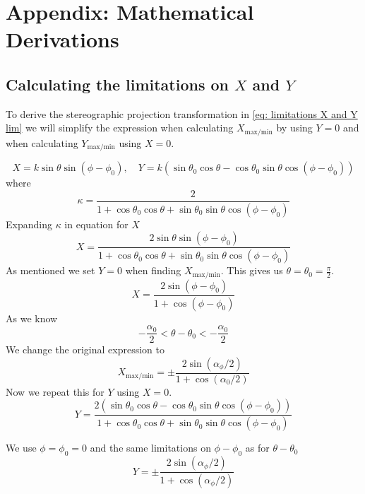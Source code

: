 \documentclass[reprint,english,notitlepage]{revtex4-2}
\begin{document}
\section{Appendix: Mathematical Derivations}
\subsection{Calculating the limitations on $ X $ and $ Y $} \label{ssec: lim x,y}
To derive the stereographic projection transformation in \ref{eq: limitations X and Y lim}
we will simplify the expression when calculating $ X_{\text{max/min}} $ by using $ Y = 0 $ and when calculating $ Y_{\text{max/min}} $ using $ X = 0 $. 

\[
X = k \sin θ \sin (ϕ - ϕ_{0}), \quad Y = k(\sin θ_{0} \cos θ - \cos  θ_{0} \sin  θ \cos (ϕ - ϕ_{0}))
\]
where
\[
κ = \frac{2}{1 + \cos  θ_{0} \cos  θ + \sin  θ_{0} \sin  θ \cos (ϕ - ϕ_{0})}
\]
Expanding $ κ $ in equation for $ X $
\[
X = \frac{2 \sin  θ \sin (ϕ - ϕ_{0})}{1 + \cos θ_{0} \cos θ + \sin  θ_{0} \sin  θ \cos (ϕ - ϕ_{0})}
\]
As mentioned we set $ Y = 0 $ when finding $ X_{\text{max/min}} $. This gives us $ θ = θ_{0} = \frac{π}{2} $. 
\[
X = \frac{2 \sin (ϕ - ϕ_{0})}{1 + \cos (ϕ-ϕ_{0})} 
\]
As we know 
\[
- \frac{α_{0}}{2} < θ - θ_{0} < - \frac{α_{0}}{2}
\]
We change the original expression to 
\[
X_{\text{max/min}} = ± \frac{2 \sin (α_{ϕ} / 2)}{1 + \cos (α_{0} / 2)}
\]
Now we repeat this for $ Y $ using $ X = 0 $. 
\[
Y = \frac{2(\sin θ_{0} \cos θ - \cos  θ_{0} \sin θ \cos (ϕ- ϕ_{0}))}{1 + \cos  θ_{0} \cos  θ + \sin  θ _{0} \sin  θ \cos (ϕ - ϕ _{0})}
\]

We use $  ϕ = ϕ_{0} = 0 $ and the same limitations on $ ϕ - ϕ_{0} $ as for $ θ - θ_{0}  $
\[
Y = ± \frac{2 \sin (α_{ϕ} / 2)}{1 + \cos (α_{ϕ} / 2)} 
\]


\newpage
\printbibliography
\end{document}
